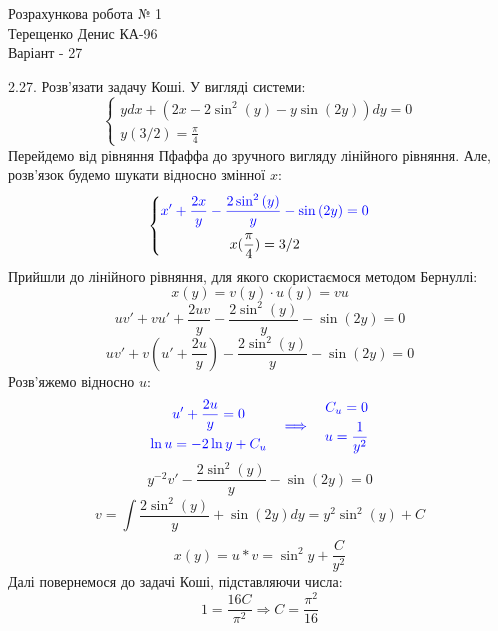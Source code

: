 \documentclass[14pt,a4paper]{scrartcl}
\theoremstyle{definition}
\newtheorem{defo}{Означення}[section]
\theoremstyle{remark}
\theoremstyle{definition}
\theoremstyle{definition}
\begin{document}
\def\be{\begin{equation}}
\def\ee{\end{equation}}
\def\bd{\begin{defo}}
\def\ed{\end{defo}}
\def\bbt{\begin{boxteo}}
\def\ebt{\end{boxteo}}
\begin{center}
Розрахункова робота № 1 \\
	Терещенко Денис КА-96 \\
	Варіант - 27
\end{center}

2.27. Розв'язати задачу Коші. У вигляді системи:
$$
\left\lbrace
\begin{gathered}
ydx + (2x - 2 \sin^2{(y)} - y \sin{(2y)}  )dy = 0\\
y(3/2) = \frac{\pi}{4}
\end{gathered}
 \right.
$$
Перейдемо від рівняння Пфаффа до зручного вигляду лінійного рівняння. Але, розв'язок будемо шукати відносно змінної $x$:
$$
\left\lbrace
\begin{gathered}
\color{blue}
x' + \frac{2x}{y} - \frac{2 \sin^2{(y)} }{y} - \sin{(2y)} = 0\\
x(\frac{\pi}{4}) = 3/2
\end{gathered}
 \right.
$$
Прийшли до лінійного рівняння, для якого скористаємося методом Бернуллі:
$$
x(y) = v(y)\cdot u(y) =vu
$$
$$
uv' + vu' + \frac{2uv}{y} - \frac{2 \sin^2{(y)} }{y} - \sin{(2y)} =0
$$
$$
uv' + v (u' + \frac{2u}{y} ) - \frac{2 \sin^2{(y)} }{y} - \sin{(2y)} =0
$$
Розв'яжемо відносно $u$:
$$
\color{blue}
\begin{gathered}
  u' + \frac{2u}{y} = 0\\
	\ln{u} = -2 \ln{y} + C_u
\end{gathered}
 \quad \Longrightarrow \quad
 \begin{gathered}
  C_u = 0 \\
	u = \frac{1}{y^2}
 \end{gathered}
$$
$$
y^{-2}v'  - \frac{2 \sin^2{(y)} }{y} - \sin{(2y)} =0
$$
$$
v =  \int\limits_{}^{}{\frac{2 \sin^2{(y)} }{y} + \sin{(2y)}dy} = y^2 \sin^2{(y)} + C
$$
$$
x(y) = u*v = \sin^2{y} + \frac{C}{y^2}
$$
Далі повернемося до задачі Коші, підставляючи числа:
$$
1 = \frac{16C}{ \pi^2} \Longrightarrow C = \frac{\pi^2}{16}
$$

\pagebreak
\end{document}

